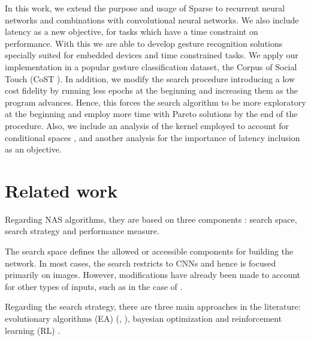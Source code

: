 \documentclass[10pt, a4paper, twocolumn]{article}
\begin{document}
In this work, we extend the purpose and usage of Sparse to recurrent neural networks and combinations with convolutional neural networks. We also include latency as a new objective, for tasks which have a time constraint on performance. With this we are able to develop gesture recognition solutions specially suited for embedded devices and time constrained tasks. We apply our implementation in a popular gesture classification dataset, the Corpus of Social Touch (CoST \cite{Jung2014}). In addition, we modify the search procedure introducing a low cost fidelity by running less epochs at the beginning and increasing them as the program advances. Hence, this forces the search algorithm to be more exploratory at the beginning and employ more time with Pareto solutions by the end of the procedure. Also, we include an analysis of the kernel employed to account for conditional spaces \cite{Swersky2014}, and another analysis for the importance of latency inclusion as an objective.

\section{Related work}

Regarding NAS algorithms, they are based on three components \cite{Elsken2019a}: search space, search strategy and performance  measure. 

The search space defines the allowed or accessible components for building the network. In most cases, the search restricts to CNNs and hence is focused primarily on images. However, modifications have already been made to account for other types of inputs, such as in the case of \cite{Wang2019a}.

Regarding the search strategy, there are three main approaches in the literature: evolutionary algorithms (EA) (\cite{Xie2017}, \cite{Stanley2002}), bayesian optimization \cite{Zhou2019a} and reinforcement learning (RL) \cite{Baker2016}. 

\end{document}
